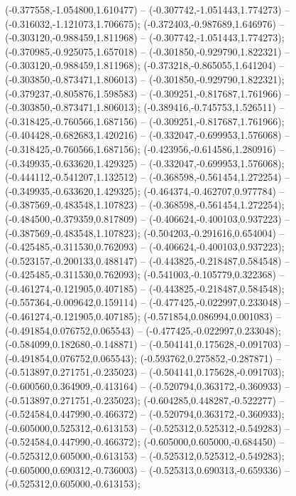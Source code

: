  (-0.377558,-1.054800,1.610477) -- (-0.307742,-1.051443,1.774273) -- (-0.316032,-1.121073,1.706675);
 (-0.372403,-0.987689,1.646976) -- (-0.303120,-0.988459,1.811968) -- (-0.307742,-1.051443,1.774273);
 (-0.370985,-0.925075,1.657018) -- (-0.301850,-0.929790,1.822321) -- (-0.303120,-0.988459,1.811968);
 (-0.373218,-0.865055,1.641204) -- (-0.303850,-0.873471,1.806013) -- (-0.301850,-0.929790,1.822321);
 (-0.379237,-0.805876,1.598583) -- (-0.309251,-0.817687,1.761966) -- (-0.303850,-0.873471,1.806013);
 (-0.389416,-0.745753,1.526511) -- (-0.318425,-0.760566,1.687156) -- (-0.309251,-0.817687,1.761966);
 (-0.404428,-0.682683,1.420216) -- (-0.332047,-0.699953,1.576068) -- (-0.318425,-0.760566,1.687156);
 (-0.423956,-0.614586,1.280916) -- (-0.349935,-0.633620,1.429325) -- (-0.332047,-0.699953,1.576068);
 (-0.444112,-0.541207,1.132512) -- (-0.368598,-0.561454,1.272254) -- (-0.349935,-0.633620,1.429325);
 (-0.464374,-0.462707,0.977784) -- (-0.387569,-0.483548,1.107823) -- (-0.368598,-0.561454,1.272254);
 (-0.484500,-0.379359,0.817809) -- (-0.406624,-0.400103,0.937223) -- (-0.387569,-0.483548,1.107823);
 (-0.504203,-0.291616,0.654004) -- (-0.425485,-0.311530,0.762093) -- (-0.406624,-0.400103,0.937223);
 (-0.523157,-0.200133,0.488147) -- (-0.443825,-0.218487,0.584548) -- (-0.425485,-0.311530,0.762093);
 (-0.541003,-0.105779,0.322368) -- (-0.461274,-0.121905,0.407185) -- (-0.443825,-0.218487,0.584548);
 (-0.557364,-0.009642,0.159114) -- (-0.477425,-0.022997,0.233048) -- (-0.461274,-0.121905,0.407185);
 (-0.571854,0.086994,0.001083) -- (-0.491854,0.076752,0.065543) -- (-0.477425,-0.022997,0.233048);
 (-0.584099,0.182680,-0.148871) -- (-0.504141,0.175628,-0.091703) -- (-0.491854,0.076752,0.065543);
 (-0.593762,0.275852,-0.287871) -- (-0.513897,0.271751,-0.235023) -- (-0.504141,0.175628,-0.091703);
 (-0.600560,0.364909,-0.413164) -- (-0.520794,0.363172,-0.360933) -- (-0.513897,0.271751,-0.235023);
 (-0.604285,0.448287,-0.522277) -- (-0.524584,0.447990,-0.466372) -- (-0.520794,0.363172,-0.360933);
 (-0.605000,0.525312,-0.613153) -- (-0.525312,0.525312,-0.549283) -- (-0.524584,0.447990,-0.466372);
 (-0.605000,0.605000,-0.684450) -- (-0.525312,0.605000,-0.613153) -- (-0.525312,0.525312,-0.549283);
 (-0.605000,0.690312,-0.736003) -- (-0.525313,0.690313,-0.659336) -- (-0.525312,0.605000,-0.613153);
